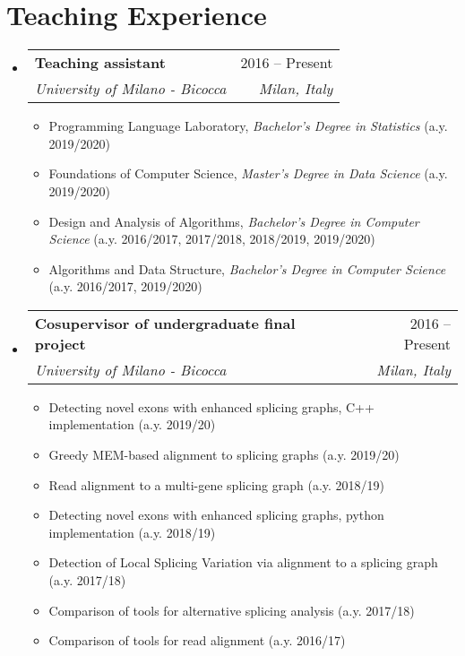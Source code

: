 \documentclass[letterpaper,11pt]{article}
\makeatletter
\newcommand{\resumeItem}[1]{
  \item\small{
    {#1 \vspace{-2pt}}
  }
}
\newcommand{\resumeSubheading}[4]{
  \vspace{-2pt}\item
    \begin{tabular*}{0.97\textwidth}[t]{l@{\extracolsep{\fill}}r}
      \textbf{#1} & #2 \\
      \textit{\small#3} & \textit{\small #4} \\
    \end{tabular*}\vspace{-7pt}
}
\newcommand{\resumeSubHeadingListStart}{\begin{itemize}[leftmargin=0.15in, label={}]}
\newcommand{\resumeSubHeadingListEnd}{\end{itemize}}
\newcommand{\resumeItemListStart}{\begin{itemize}}
\newcommand{\resumeItemListEnd}{\end{itemize}\vspace{-5pt}}
\makeatother
\begin{document}
\section{Teaching Experience}
  \resumeSubHeadingListStart
    \resumeSubheading
      {Teaching assistant}{2016 -- Present}
      {University of Milano - Bicocca}{Milan, Italy}
      \resumeItemListStart
        \resumeItem{Programming Language Laboratory, \textit{Bachelor's Degree in Statistics} (a.y. 2019/2020)}
        \resumeItem{Foundations of Computer Science, \textit{Master's Degree in Data Science} (a.y. 2019/2020)}
        \resumeItem{Design and Analysis of Algorithms, \textit{Bachelor's Degree in Computer Science} (a.y. 2016/2017, 2017/2018, 2018/2019, 2019/2020)}
        \resumeItem{Algorithms and Data Structure, \textit{Bachelor's Degree in Computer Science} (a.y. 2016/2017, 2019/2020)}
      \resumeItemListEnd
    \resumeSubheading
      {Cosupervisor of undergraduate final project}{2016 -- Present}
      {University of Milano - Bicocca}{Milan, Italy}
      \resumeItemListStart
        \resumeItem{Detecting novel exons with enhanced splicing graphs, C++ implementation (a.y. 2019/20)}
        \resumeItem{Greedy MEM-based alignment to splicing graphs (a.y. 2019/20)}
        \resumeItem{Read alignment to a multi-gene splicing graph (a.y. 2018/19)}
        \resumeItem{Detecting novel exons with enhanced splicing graphs, python implementation (a.y. 2018/19)}
        \resumeItem{Detection of Local Splicing Variation via alignment to a splicing graph (a.y. 2017/18)}
        \resumeItem{Comparison of tools for alternative splicing analysis (a.y. 2017/18)}
        \resumeItem{Comparison of tools for read alignment (a.y. 2016/17)}
      \resumeItemListEnd
  \resumeSubHeadingListEnd
\end{document}
